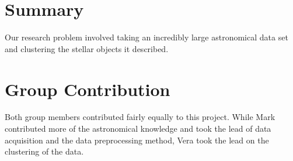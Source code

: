\documentclass[12pt]{article}
\begin{document}



\section{Summary} %
\label{sec:Summary}
Our research problem involved taking an incredibly large astronomical data set and clustering the stellar objects it described.

\newpage
\section{Group Contribution} %
\label{sec:Group Contribution}
Both group members contributed fairly equally to this project.
While Mark contributed more of the astronomical knowledge and took the lead of data acquisition and the data preprocessing method, Vera took the lead on the clustering of the data.

\newpage


\end{document}
